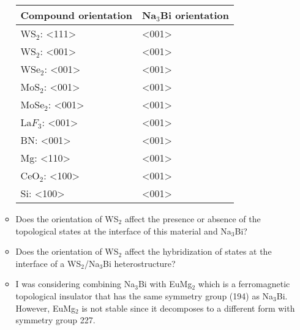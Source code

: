 \documentclass[english]{article}
\begin{document}
\begin{enumerate}
\begin{itemize}
            \begin{center}
            \begin{tabular}{ | m{4cm} | m{3cm} | } 
            \hline
            Compound orientation & Na$_{3}$Bi orientation \\ 
            \hline
            WS$_2$: <111> & <001> \\
            \hline
            WS$_2$: <001> & <001> \\
            \hline
            WSe$_2$: <001> & <001>\\
            \hline
            MoS$_2$: <001> & <001>\\
            \hline
            MoSe$_2$: <001> & <001>\\
            \hline
            La$F_3$: <001> & <001>\\
            \hline
            BN: <001> & <001>\\
            \hline
            Mg: <110> & <001>\\
            \hline
            CeO$_2$: <100> & <001>\\
            \hline
            Si: <100> & <001>\\
            \hline
            \end{tabular}
            \end{center}
            
            \item Does the orientation of WS$_2$ affect the presence or absence of the topological states at the interface of this material and Na$_{3}$Bi?
            
            \item  Does the orientation of WS$_2$ affect the hybridization of states at the interface of a WS$_2$/Na$_3$Bi heterostructure?
            
            \item I was considering combining Na$_3$Bi with EuMg$_2$ which is a ferromagnetic topological insulator that has the same symmetry group (194) as Na$_3$Bi.  However, EuMg$_2$ is not stable since it decomposes to a different form with symmetry group 227.   
            
        \end{itemize}
        
\end{enumerate}
\end{document}
